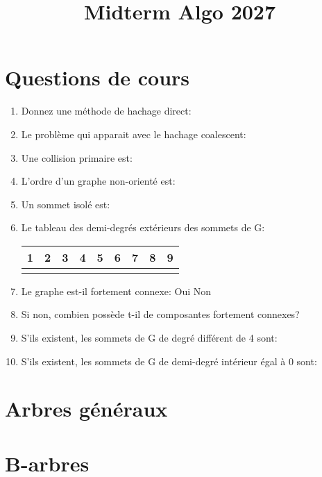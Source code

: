\documentclass{article}
\author{}
\date{}
\title{Midterm Algo 2027}
\begin{document}
\maketitle
\newpage
\newpage

\section{Questions de cours}
\begin{enumerate}
    \item Donnez une méthode de hachage direct:
    \item Le problème qui apparait avec le hachage coalescent:
    \item Une collision primaire est:
    \item L'ordre d'un graphe non-orienté est:
    \item Un sommet isolé est:
    \item Le tableau des demi-degrés extérieurs des sommets de G:
    \begin{center}
    \begin{tabular}{ |c| c| c| c| c| c| c| c| c| }
        \hline
        1 & 2 & 3 & 4 & 5 & 6 & 7 & 8 & 9 \\
        \hline
          &   &   &   &   &   &   &   &   \\
        \hline
    \end{tabular}
    \end{center}
    \item Le graphe est-il fortement connexe: Oui        Non
    \item Si non, combien possède t-il de composantes fortement connexes?
    \item S'ils existent, les sommets de G de degré différent de 4 sont:
    \item S'ils existent, les sommets de G de demi-degré intérieur égal à 0 sont:
\end{enumerate}

\section{Arbres généraux}
\section{B-arbres}
\end{document}
